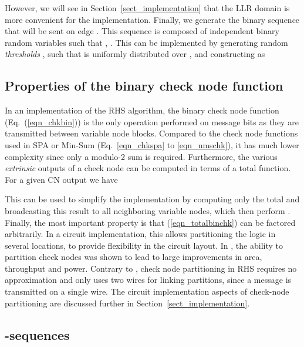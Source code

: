 \documentclass[12pt,journal,twoside,draftcls,onecolumn]{IEEEtran}
\begin{document}
	However, we will see in Section~\ref{sect_implementation} that the LLR domain is more convenient for the implementation.
	Finally, we generate the binary sequence that will be sent on edge . This sequence is composed of  independent binary random variables  such that , . This can be implemented by generating  random \emph{thresholds} , such that  is uniformly distributed over , and constructing  as
	
	


\subsection{Properties of the binary check node function}
\label{sect_chkproperties}

In an implementation of the RHS algorithm, the binary check node function (Eq.~(\ref{eqn_chkbin})) is the only operation performed on message bits as they are transmitted between variable node blocks.
Compared to the check node functions used in SPA or Min-Sum (Eq.~\ref{eqn_chkspa} to \ref{eqn_nmschk}), it has much lower complexity since only a modulo-2 sum is required. Furthermore, the various \emph{extrinsic} outputs of a check node can be computed in terms of a total function. For a given CN output  we have

This can be used to simplify the implementation by computing only the total  
and broadcasting this result to all neighboring variable nodes, which then perform .
Finally, the most important property is that (\ref{eqn_totalbinchk}) can be factored arbitrarily. In a circuit implementation, this allows partitioning the logic in several locations, to provide flexibility in the circuit layout. In \cite{mohsenin:2010}, the ability to partition check nodes was shown to lead to large improvements in area, throughput and power. Contrary to \cite{mohsenin:2010}, check node partitioning in RHS requires no approximation and only uses two wires for linking partitions, since a message is transmitted on a single wire.
The circuit implementation aspects of check-node partitioning are discussed further in Section~\ref{sect_implementation}.


\subsection{-sequences}
\label{sect_relaxation}
\end{document}
